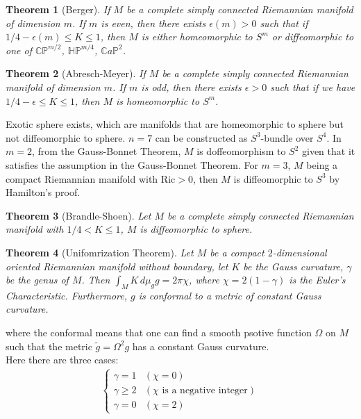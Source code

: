 \documentclass[11pt]{book}
\theoremstyle{break}
\theoremstyle{break}
\newtheorem{thm}{Theorem}[section]
\newcommand{\that}[1]{\widetilde{#1}}
\begin{document}
\begin{thm}[Berger]
If $M$ be a complete simply connected Riemannian manifold of dimension $m$. If $m$ is even, then there exists $\epsilon(m) >0$ such that if $1/4-\epsilon(m) \leq K \leq 1$, then $M$ is either homeomorphic to $S^m$ or diffeomorphic to one of $\mathbb{C}\mathbb{P}^{m/2}$, $\mathbb{H}\mathbb{P}^{m/4}$, $\mathbb{C}a\mathbb{P}^{2}$. 
\end{thm}

\begin{thm}[Abresch-Meyer]
If $M$ be a complete simply connected Riemannian manifold of dimension $m$.  If $m$ is odd, then there exists $\epsilon>0$ such that if we have $1/4 -\epsilon \leq K \leq 1$, then $M$ is homeomorphic to $S^m$. 
\end{thm}

Exotic sphere exists, which are manifolds that are homeomorphic to sphere but not diffeomorphic to sphere. $n=7$ can be constructed as $S^3$-bundle over $S^4$. In $m=2$, from the Gauss-Bonnet Theorem, $M$ is doffeomorphism to $S^2$ given that it satisfies the assumption in the Gauss-Bonnet Theorem. For $m=3$, $M$ being a compact Riemannian manifold with $\text{Ric} >0$, then $M$ is diffeomorphic to $S^3$ by Hamilton's proof.\\

\begin{thm}[Brandle-Shoen]
Let $M$ be a complete simply connected Riemannian manifold with $1/4 < K \leq 1$, $M$ is diffeomorphic to sphere.  
\end{thm}

\newpage
\begin{thm}[Unifomrization Theorem]
Let $M$ be a compact $2$-dimensional oriented Riemannian manifold without boundary, let $K$ be the Gauss curvature, $\gamma$ be the genus of $M$. Then $\int_M K \, d\mu_gg = 2\pi \chi$, where $\chi = 2(1-\gamma)$ is the Euler's Characteristic. Furthermore, $g$ is conformal to a metric of constant Gauss curvature. 
\end{thm}

where the conformal means that one can find a smooth psotive function $\Omega$ on $M$ such that the metric $\that{g} = \Omega^2 g$ has a constant Gauss curvature.\\

Here there are three cases:
\begin{align*}
\begin{cases}
\gamma = 1 & (\chi = 0) \\
\gamma \geq 2 & ( \chi \text{ is a negative integer})\\
\gamma = 0 & (\chi=2)
\end{cases}
\end{align*}
\end{document}

